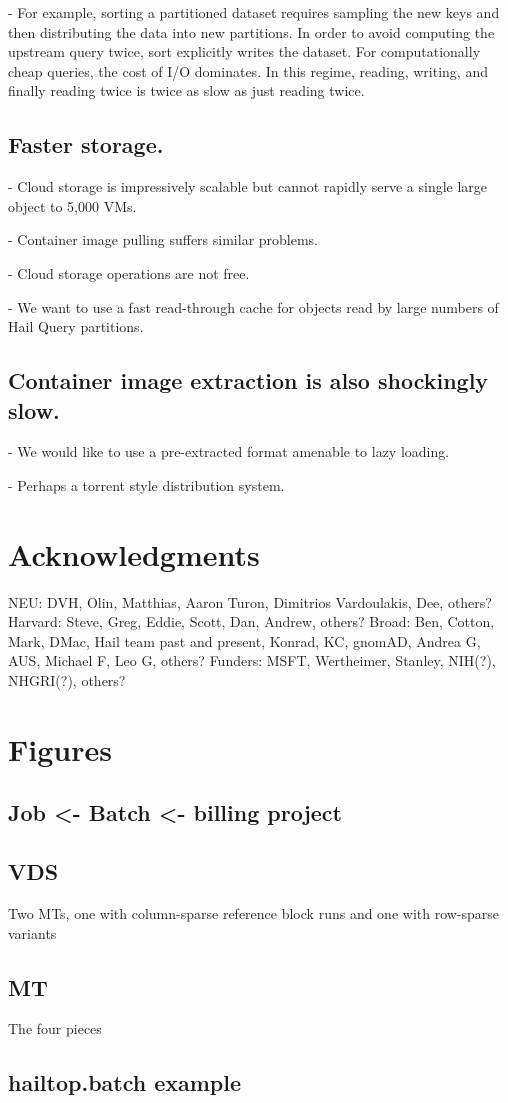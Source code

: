\documentclass[sigconf, nonacm]{acmart}
\begin{document}
    - For example, sorting a partitioned dataset requires sampling the new keys and then distributing the data into new partitions. In order to avoid computing the upstream query twice, sort explicitly writes the dataset. For computationally cheap queries, the cost of I/O dominates. In this regime, reading, writing, and finally reading twice is twice as slow as just reading twice.

\subsection{Faster storage.}

    - Cloud storage is impressively scalable but cannot rapidly serve a single large object to 5,000 VMs.

    - Container image pulling suffers similar problems.

    - Cloud storage operations are not free.

    - We want to use a fast read-through cache for objects read by large numbers of Hail Query partitions.

\subsection{Container image extraction is also shockingly slow.}

    - We would like to use a pre-extracted format amenable to lazy loading.

    - Perhaps a torrent style distribution system.

\section{Acknowledgments}

NEU: DVH, Olin, Matthias, Aaron Turon, Dimitrios Vardoulakis, Dee, others? Harvard: Steve, Greg, Eddie, Scott, Dan, Andrew, others? Broad: Ben, Cotton, Mark, DMac, Hail team past and present, Konrad, KC, gnomAD, Andrea G, AUS, Michael F, Leo G, others? Funders: MSFT, Wertheimer, Stanley, NIH(?), NHGRI(?), others?

\section{Figures}

\subsection{Job <- Batch <- billing project}

\subsection{VDS}

Two MTs, one with column-sparse reference block runs and one with row-sparse variants

\subsection{MT}

The four pieces

\subsection{hailtop.batch example}




\end{document}
